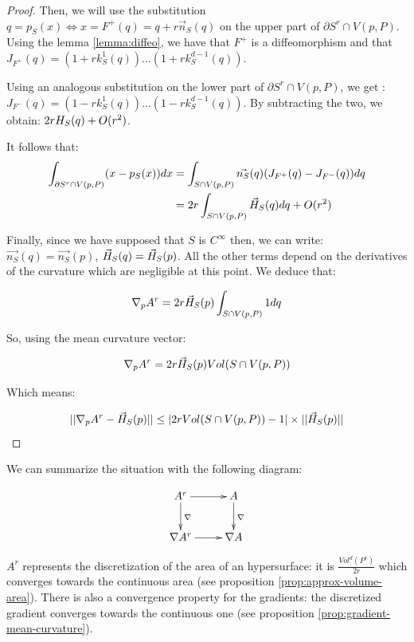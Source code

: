 \begin{proof}
Then, we will use the substitution $ q = p_S(x) \iff x = F^{+}(q) = q +
r \vec{n}_S(q) $ on the upper part of $ \partial{S^r} \cap V(p, P) $. Using
the lemma \ref{lemma:diffeo}, we have that $ F^{+} $ is a diffeomorphism and that
$ J_{F^+}(q) = (1 + r k^1_S(q)) \hdots (1 + r k^{d-1}_S(q)) $.

Using an analogous substitution on the lower part of $ \partial{S^r} \cap V(p,
P) $, we get : $ J_{F^-}(q) = (1 - r k^1_S(q)) \hdots (1 - r k^{d-1}_S(q)) $. By
subtracting the two, we obtain: $ 2 r H_{S}(q) + O(r^2) $.

It follows that:
\begin{align*}
    \int_{\partial{S^r} \cap V(p, P)} (x - p_S(x)) dx &= \int_{S \cap V(p, P)}
    \vec{n_S}(q) ( J_{F^+}(q) -J_{F^-}(q) ) dq \\
    &= 2r \int_{S \cap V(p, P)} \vec{H}_{S}(q) dq + O(r^2) \\
\end{align*}

Finally, since we have supposed that $ S $ is $ C^{\infty} $ then, we can write:
$ \vec{n_S}(q) = \vec{n_S}(p) $, $ \vec{H}_{S}(q) = \vec{H}_{S}(p) $. All the other
terms depend on the derivatives of the curvature which are negligible at this
point. We deduce that:

$$ \nabla_p A^r = 2r \vec{H}_{S}(p) \int_{S \cap V(p, P)} 1 dq $$

So, using the mean curvature vector:

$$ \nabla_p A^r = 2r \vec{H}_{S}(p) Vol(S \cap V(p, P)) $$

Which means:

$$ ||\nabla_p A^r - \vec{H}_{S}(p) || \leq | 2r Vol(S \cap V(p, P)) - 1 |
\times|| \vec{H}_{S}(p) ||$$

\end{proof}

We can summarize the situation with the following diagram:

\begin{displaymath}
    \xymatrix{A^r \ar[d]^{\nabla} \ar[r] & A \ar[d]^{\nabla} \\
        \nabla A^r \ar[r] & \nabla A }
\end{displaymath}

$ A^r $ represents the discretization of the area of an hypersurface: it
is $ \frac{Vol^d(P^r)}{2r} $ which converges towards the continuous area (see
proposition \ref{prop:approx-volume-area}). There is also a convergence property
for the gradients: the discretized gradient converges towards the continuous one
(see proposition \ref{prop:gradient-mean-curvature}).

